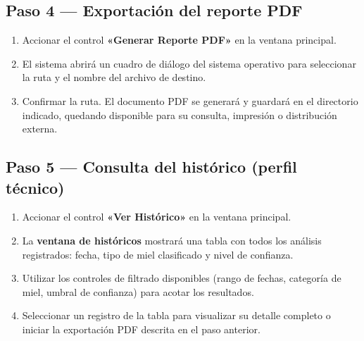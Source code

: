 \subsection*{Paso 4 — Exportación del reporte PDF}

\begin{enumerate}
    \item Accionar el control \textbf{«Generar Reporte PDF»} en la ventana
    principal.
    \item El sistema abrirá un cuadro de diálogo del sistema operativo para
    seleccionar la ruta y el nombre del archivo de destino.
    \item Confirmar la ruta. El documento PDF se generará y guardará en el
    directorio indicado, quedando disponible para su consulta, impresión o
    distribución externa.
\end{enumerate}

\subsection*{Paso 5 — Consulta del histórico (perfil técnico)}

\begin{enumerate}
    \item Accionar el control \textbf{«Ver Histórico»} en la ventana principal.
    \item La \textbf{ventana de históricos} mostrará una tabla con todos los
    análisis registrados: fecha, tipo de miel clasificado y nivel de confianza.
    \item Utilizar los controles de filtrado disponibles (rango de fechas,
    categoría de miel, umbral de confianza) para acotar los resultados.
    \item Seleccionar un registro de la tabla para visualizar su detalle
    completo o iniciar la exportación PDF descrita en el paso anterior.
\end{enumerate}

\newpage
